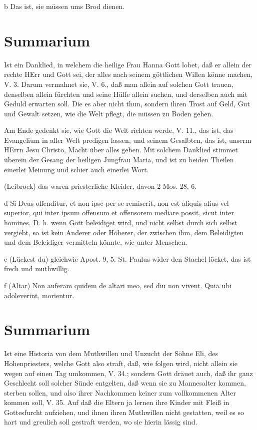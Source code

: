 b Das ist, sie müssen ums Brod dienen.

\section{Summarium}

Ist ein Danklied, in welchem die heilige Frau Hanna Gott lobet, daß er allein der rechte HErr und Gott sei, der alles nach seinem göttlichen Willen könne machen, V. 3. Darum vermahnet sie, V. 6., daß man allein auf solchen Gott trauen, denselben allein fürchten und seine Hülfe allein suchen, und derselben auch mit Geduld erwarten soll. Die es aber nicht thun, sondern ihren Trost auf Geld, Gut und Gewalt setzen, wie die Welt pflegt, die müssen zu Boden gehen.

Am Ende gedenkt sie, wie Gott die Welt richten werde, V. 11., das ist, das Evangelium in aller Welt predigen lassen, und seinem Gesalbten, das ist, unserm HErrn Jesu Christo, Macht über alles geben. Mit solchem Danklied stimmet überein der Gesang der heiligen Jungfrau Maria, und ist zu beiden Theilen einerlei Meinung und schier auch einerlei Wort.

(Leibrock) das waren priesterliche Kleider, davon 2 Mos. 28, 6.

d Si Deus offenditur, et non ipse per se remiserit, non est aliquis alius vel superior, qui inter ipsum offensum et offensorem mediare possit, sicut inter homines. D. h. wenn Gott beleidiget wird, und nicht selbst durch sich selbst vergiebt, so ist kein Anderer oder Höherer, der zwischen ihm, dem Beleidigten und dem Beleidiger vermitteln könnte, wie unter Menschen.

e (Lückest du) gleichwie Apost. 9, 5. St. Paulus wider den Stachel löcket, das ist frech und muthwillig.

f (Altar) Non auferam quidem de altari meo, sed diu non vivent. Quia ubi adoleverint, morientur.

\section{Summarium}

Ist eine Historia von dem Muthwillen und Unzucht der Söhne Eli, des Hohenpriesters, welche Gott also straft, daß, wie folgen wird, nicht allein sie wegen auf einen Tag umkommen, V. 34.; sondern Gott dräuet auch, daß ihr ganz Geschlecht soll solcher Sünde entgelten, daß wenn sie zu Mannesalter kommen, sterben sollen, und also ihrer Nachkommen keiner zum vollkommenen Alter kommen soll, V. 35. Auf daß die Eltern ja lernen ihre Kinder mit Fleiß in Gottesfurcht aufziehen, und ihnen ihren Muthwillen nicht gestatten, weil es so hart und greulich soll gestraft werden, wo sie hierin lässig sind.

